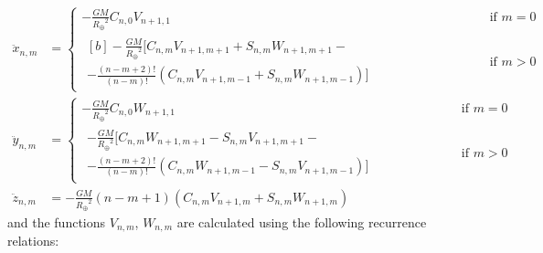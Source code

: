 \documentclass[../main.tex]{subfiles}
\begin{document}
\begin{align}
  \ddot{x}_{n,m} & =\begin{cases}
                      \displaystyle-\frac{GM}{{R_\oplus}^2}C_{n,0}V_{n+1,1}                                                                                              & \text{ if $m=0$} \\[10pt]
                      \begin{aligned}[b]
      \displaystyle-\frac{GM}{{R_\oplus}^2}\bigg[C_{n,m}V_{n+1,m+1}+ S_{n,m}W_{n+1,m+1}-\hspace{4cm} \\
      -  \frac{{(n-m+2)}!}{{(n-m)}!}\left(C_{n,m}V_{n+1,m-1}+S_{n,m}W_{n+1,m-1}\right)\bigg]
    \end{aligned} & \text{ if $m>0$}
                    \end{cases} \\
  \ddot{y}_{n,m} & =\begin{cases}
                      \displaystyle-\frac{GM}{{R_\oplus}^2}C_{n,0}W_{n+1,1}                                                                                              & \text{ if $m=0$} \\[10pt]
                      \begin{aligned}
      \displaystyle -\frac{GM}{{R_\oplus}^2}\bigg[C_{n,m}W_{n+1,m+1}-S_{n,m}V_{n+1,m+1}-\hspace{4cm} \\
      -\frac{{(n-m+2)}!}{{(n-m)}!}\left(C_{n,m}W_{n+1,m-1}-S_{n,m}V_{n+1,m-1}\right)\bigg]
    \end{aligned} & \text{ if $m>0$}
                    \end{cases} \\
  \ddot{z}_{n,m} & =-\frac{GM}{{R_\oplus}^2}(n-m+1)\left(C_{n,m}V_{n+1,m}+S_{n,m}W_{n+1,m}\right)
\end{align}
and the functions $V_{n,m}$, $W_{n,m}$ are calculated using the following recurrence relations:
\end{document}
